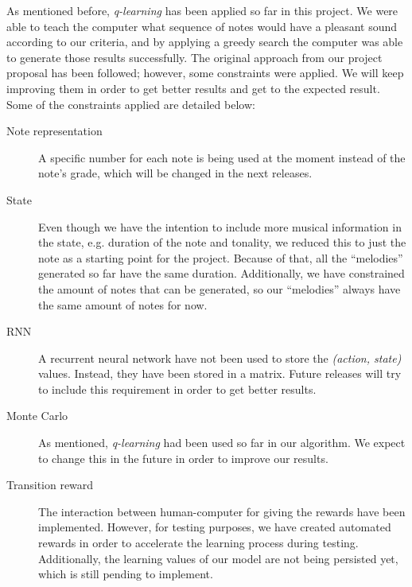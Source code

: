 As mentioned before, \emph{q-learning} has been applied so far in this project. We were able to teach the computer what sequence of notes would have a pleasant sound according to our criteria, and by applying a greedy search the computer was able to generate those results successfully. The original approach from our project proposal has been followed; however, some constraints were applied. We will keep improving them in order to get better results and get to the expected result. Some of the constraints applied are detailed below:

\begin{description}
  \item [Note representation] A specific number for each note is being used at the moment instead of the note's grade, which will be changed in the next releases.
  \item [State] Even though we have the intention to include more musical information in the state, e.g. duration of the note and tonality, we reduced this to just the note as a starting point for the project. Because of that, all the ``melodies'' generated so far have the same duration. Additionally, we have constrained the amount of notes that can be generated, so our ``melodies'' always have the same amount of notes for now.
  \item [RNN] A recurrent neural network have not been used to store the \emph{(action, state)} values. Instead, they have been stored in a matrix. Future releases will try to include this requirement in order to get better results.
  \item [Monte Carlo] As mentioned, \emph{q-learning} had been used so far in our algorithm. We expect to change this in the future in order to improve our results.
  \item [Transition reward] The interaction between human-computer for giving the rewards have been implemented. However, for testing purposes, we have created automated rewards in order to accelerate the learning process during testing. Additionally, the learning values of our model are not being persisted yet, which is still pending to implement.
\end{description}
